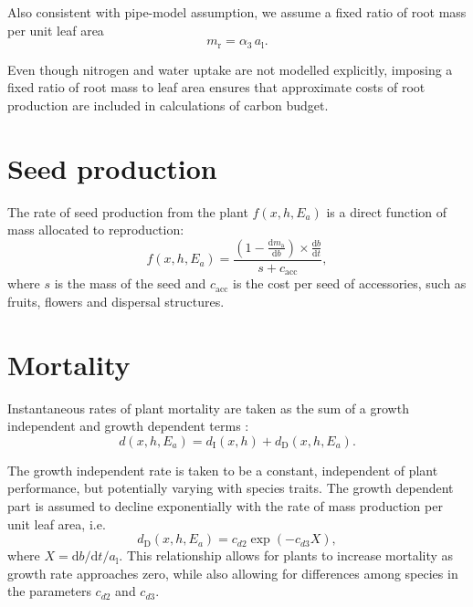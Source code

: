 \documentclass[10pt,twoside]{article}
\begin{document}
Also consistent with pipe-model assumption, we assume a fixed ratio of
root mass per unit leaf area
\begin{equation}\label{eq:mr}
m_\textrm{r}=\alpha_3 \, a_\textrm{l}.
\end{equation}

Even though nitrogen and water uptake are not modelled explicitly,
imposing a fixed ratio of root mass to leaf area ensures that
approximate costs of root production are included in calculations of
carbon budget.

\section{Seed production}\label{seed-production}

The rate of seed production from the plant \(f(x,h,E_a)\) is a direct
function of mass allocated to reproduction:
\begin{equation}\label{eq:fecundity}
f(x,h,E_a) = \frac{(1-\frac{\textrm{d}m_\textrm{a}}{\textrm{d}b}) \times \frac{\textrm{d}b}{\textrm{d}t}}{
  s + c_{\textrm{acc}}},
\end{equation}
where \(s\) is the mass of the seed and \(c_{\textrm{acc}}\) is the cost
per seed of accessories, such as fruits, flowers and dispersal
structures.

\section{Mortality}\label{mortality}

Instantaneous rates of plant mortality are taken as the sum of a growth
independent and growth dependent terms
\citep{Falster-2011, Moorcroft-2001}:
\begin{equation}\label{eq:mortality}
d(x,h,E_a) = d_{\textrm{I}}(x,h) + d_{\textrm{D}}(x,h,E_a).
\end{equation}

The growth independent rate is taken to be a constant, independent of
plant performance, but potentially varying with species traits. The
growth dependent part is assumed to decline exponentially with the rate
of mass production per unit leaf area, i.e.
\begin{equation}\label{eq:mortality_GD}
d_{\textrm{D}}(x,h,E_a) =  c_{d2}  \exp(-c_{d3} X),
\end{equation}
where \(X = \textrm{d}b / \textrm{d}t / a_\textrm{l}\). This
relationship allows for plants to increase mortality as growth rate
approaches zero, while also allowing for differences among species in
the parameters \(c_{d2}\) and \(c_{d3}\).
\end{document}
